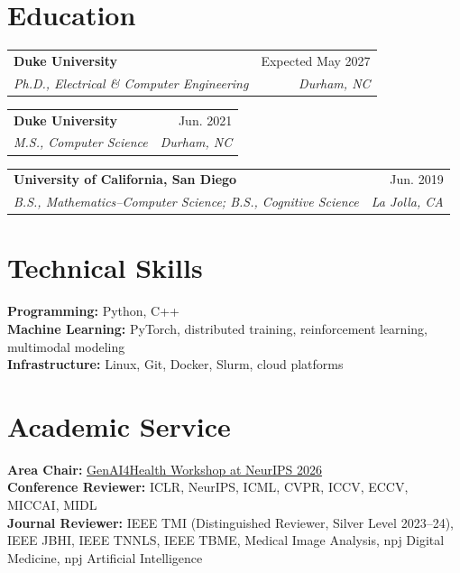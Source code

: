 \documentclass[letterpaper,10pt]{article}
\makeatletter
\newcommand{\entry}[4]{%
  \begin{tabular*}{\textwidth}{l@{\extracolsep{\fill}}r}
    \textbf{#1} & #2 \\
    \textit{#3} & \textit{#4}
  \end{tabular*}\vspace{-4pt}
}
\makeatother
\begin{document}
\section{Education}
\entry{Duke University}{Expected May 2027}{Ph.D., Electrical \& Computer Engineering}{Durham, NC}
\vspace{6pt}

\entry{Duke University}{Jun. 2021}{M.S., Computer Science}{Durham, NC}
\vspace{8pt}

\entry{University of California, San Diego}{Jun. 2019}{B.S., Mathematics--Computer Science; B.S., Cognitive Science}{La Jolla, CA}

\section{Technical Skills}
\textbf{Programming:} Python, C++\\[2pt]
\textbf{Machine Learning:} PyTorch, distributed training, reinforcement learning, multimodal modeling\\[2pt]
\textbf{Infrastructure:} Linux, Git, Docker, Slurm, cloud platforms

\section{Academic Service}
\textbf{Area Chair:} \href{https://genai4health.github.io/2026-NeurIPS/}{GenAI4Health Workshop at NeurIPS 2026}\\[2pt]
\textbf{Conference Reviewer:} ICLR, NeurIPS, ICML, CVPR, ICCV, ECCV, MICCAI, MIDL\\[2pt]
\textbf{Journal Reviewer:} IEEE TMI (Distinguished Reviewer, Silver Level 2023--24), IEEE JBHI, IEEE TNNLS, IEEE TBME, Medical Image Analysis, npj Digital Medicine, npj Artificial Intelligence
\end{document}
